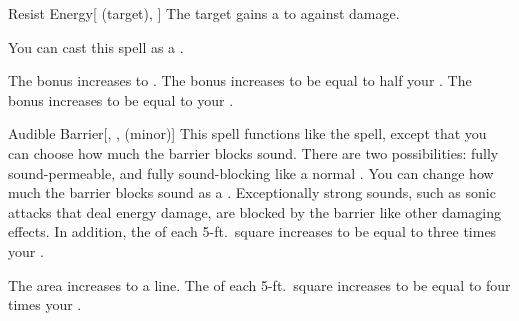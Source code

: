 \lowercase{\hypertarget{spell:Resist Energy}{}}\label{spell:Resist Energy}
\begin{attuneability}[Rank 1]{\hypertarget{spell:Resist Energy}{Resist Energy}}[ (target), ]
The target gains a   to  against  damage.

You can cast this spell as a .

\rankline
{} The bonus increases to .
 The bonus increases to be equal to half your .
 The bonus increases to be equal to your .
\end{attuneability}
\vspace{0.25em}



\lowercase{\hypertarget{spell:Audible Barrier}{}}\label{spell:Audible Barrier}
\begin{freeability}[Rank 3]{\hypertarget{spell:Audible Barrier}{Audible Barrier}}[, ,  (minor)]
\targetrule
This spell functions like the  spell, except that you can choose how much the barrier blocks sound.
There are two possibilities: fully sound-permeable, and fully sound-blocking like a normal .
You can change how much the barrier blocks sound as a .
Exceptionally strong sounds, such as sonic attacks that deal energy damage, are blocked by the barrier like other damaging effects.
In addition, the  of each 5-ft.\ square increases to be equal to three times your .

 The area increases to a \arealarge line.
 The  of each 5-ft.\ square increases to be equal to four times your .
\end{freeability}
\vspace{0.25em}



